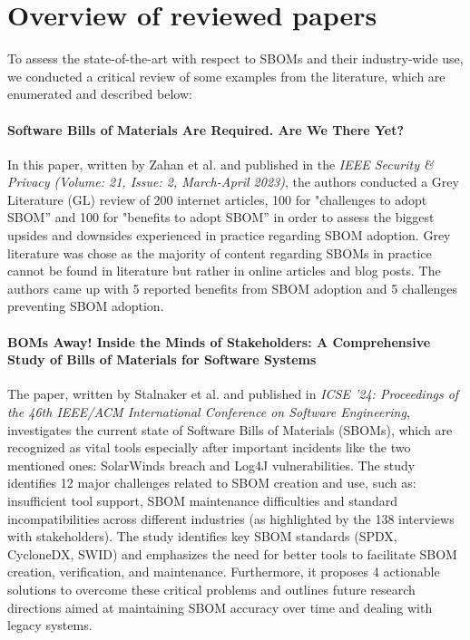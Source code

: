 \section{Overview of reviewed papers}

To assess the state-of-the-art with respect to SBOMs and their industry-wide use, we conducted a critical review of some examples from the literature, which are enumerated and described below:

\paragraph{Software Bills of Materials Are Required. Are We There Yet?} \cite{article:sbom-required} In this paper, written by Zahan et al. and published in the \emph{IEEE Security \& Privacy (Volume: 21, Issue: 2, March-April 2023)}, the authors conducted a Grey Literature (GL) review of 200 internet articles, 100 for "challenges to adopt SBOM” and 100 for "benefits to adopt SBOM” in order to assess the biggest upsides and downsides experienced in practice regarding SBOM adoption. Grey literature was chose as the majority of content regarding SBOMs in practice cannot be found in literature but rather in online articles and blog posts. The authors came up with 5 reported benefits from SBOM adoption and 5 challenges preventing SBOM adoption.

\paragraph{BOMs Away! Inside the Minds of Stakeholders: A Comprehensive Study of Bills of Materials for Software Systems} \cite{article:software-bom} The paper, written by Stalnaker et al. and published in \emph{ICSE '24: Proceedings of the 46th IEEE/ACM International Conference on Software Engineering}, investigates the current state of Software Bills of Materials (SBOMs), which are recognized as vital tools especially after important incidents like the two mentioned ones: SolarWinds breach and Log4J vulnerabilities. The study identifies 12 major challenges related to SBOM creation and use, such as: insufficient tool support, SBOM maintenance difficulties and standard incompatibilities across different industries (as highlighted by the 138 interviews with stakeholders). The study identifies key SBOM standards (SPDX, CycloneDX, SWID) and emphasizes the need for better tools to facilitate SBOM creation, verification, and maintenance. Furthermore, it proposes 4 actionable solutions to overcome these critical problems and outlines future research directions aimed at maintaining SBOM accuracy over time and dealing with legacy systems.

